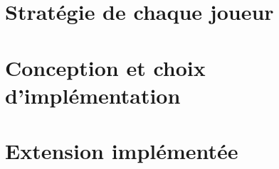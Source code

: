 \documentclass[10pt, a4paper]{article}
\begin{document}


{}
\setcounter{page}{1}

\section{Stratégie de chaque joueur}

\section{Conception et  choix d'implémentation}

\section{Extension implémentée}
\end{document}
